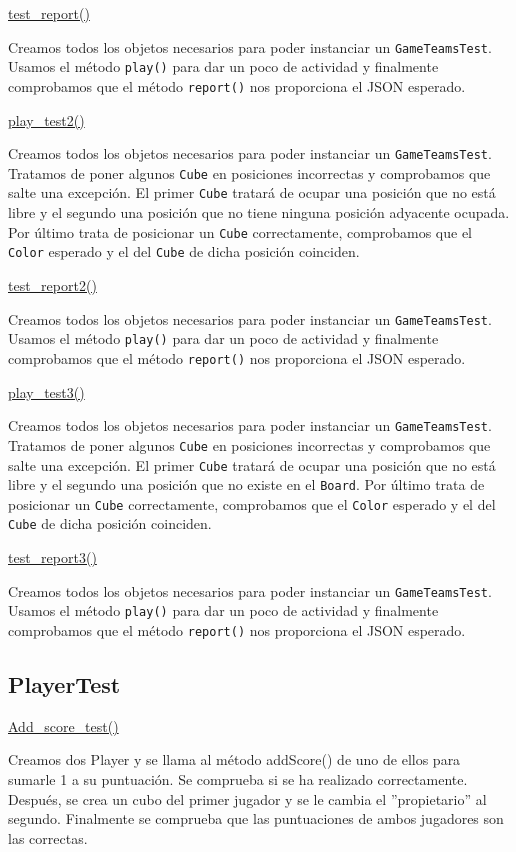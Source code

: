 \documentclass[../DocumentoOficial.tex]{subfiles}
\begin{document}
\underline{test\_report()}

Creamos todos los objetos necesarios para poder instanciar un \texttt{GameTeamsTest}. Usamos el método \texttt{play()} para dar un poco de actividad y finalmente comprobamos que el método \texttt{report()} nos proporciona el JSON esperado.

\underline{play\_test2()}

Creamos todos los objetos necesarios para poder instanciar un \texttt{GameTeamsTest}. Tratamos de poner algunos \texttt{Cube} en posiciones incorrectas y comprobamos que salte una excepción. El primer \texttt{Cube} tratará de ocupar una posición que no está libre y el segundo una posición que no tiene ninguna posición adyacente ocupada. Por último trata de posicionar un \texttt{Cube} correctamente, comprobamos que el \texttt{Color} esperado y el del \texttt{Cube} de dicha posición coinciden.

\underline{test\_report2()}

Creamos todos los objetos necesarios para poder instanciar un \texttt{GameTeamsTest}. Usamos el método \texttt{play()} para dar un poco de actividad y finalmente comprobamos que el método \texttt{report()} nos proporciona el JSON esperado.

\underline{play\_test3()}

Creamos todos los objetos necesarios para poder instanciar un \texttt{GameTeamsTest}. Tratamos de poner algunos \texttt{Cube} en posiciones incorrectas y comprobamos que salte una excepción. El primer \texttt{Cube} tratará de ocupar una posición que no está libre y el segundo una posición que no existe en el \texttt{Board}. Por último trata de posicionar un \texttt{Cube} correctamente, comprobamos que el \texttt{Color} esperado y el del \texttt{Cube} de dicha posición coinciden.

\underline{test\_report3()}

Creamos todos los objetos necesarios para poder instanciar un \texttt{GameTeamsTest}. Usamos el método \texttt{play()} para dar un poco de actividad y finalmente comprobamos que el método \texttt{report()} nos proporciona el JSON esperado.

\subsection{PlayerTest}
\underline{Add\_score\_test()}

Creamos dos Player y se llama al método addScore() de uno de ellos para sumarle 1 a su puntuación. Se comprueba si se ha realizado correctamente. Después, se crea un cubo del primer jugador y se le cambia el ''propietario'' al segundo. Finalmente se comprueba que las puntuaciones de ambos jugadores son las correctas.
\end{document}
